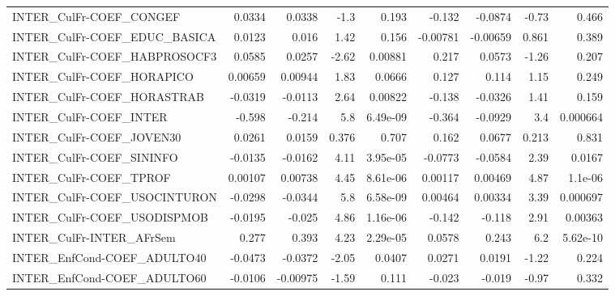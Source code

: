 \begin{tabular}{lrrrrrrrr}
INTER\_CulFr-COEF\_CONGEF               &      0.0334 &       0.0338 &    -1.3 &    0.193 &     -0.132 &     -0.0874 &        -0.73 &         0.466 \\
INTER\_CulFr-COEF\_EDUC\_BASICA          &      0.0123 &        0.016 &    1.42 &    0.156 &   -0.00781 &    -0.00659 &        0.861 &         0.389 \\
INTER\_CulFr-COEF\_HABPROSOCF3          &      0.0585 &       0.0257 &   -2.62 &  0.00881 &      0.217 &      0.0573 &        -1.26 &         0.207 \\
INTER\_CulFr-COEF\_HORAPICO             &     0.00659 &      0.00944 &    1.83 &   0.0666 &      0.127 &       0.114 &         1.15 &         0.249 \\
INTER\_CulFr-COEF\_HORASTRAB            &     -0.0319 &      -0.0113 &    2.64 &  0.00822 &     -0.138 &     -0.0326 &         1.41 &         0.159 \\
INTER\_CulFr-COEF\_INTER                &      -0.598 &       -0.214 &     5.8 & 6.49e-09 &     -0.364 &     -0.0929 &          3.4 &      0.000664 \\
INTER\_CulFr-COEF\_JOVEN30              &      0.0261 &       0.0159 &   0.376 &    0.707 &      0.162 &      0.0677 &        0.213 &         0.831 \\
INTER\_CulFr-COEF\_SININFO              &     -0.0135 &      -0.0162 &    4.11 & 3.95e-05 &    -0.0773 &     -0.0584 &         2.39 &        0.0167 \\
INTER\_CulFr-COEF\_TPROF                &     0.00107 &      0.00738 &    4.45 & 8.61e-06 &    0.00117 &     0.00469 &         4.87 &       1.1e-06 \\
INTER\_CulFr-COEF\_USOCINTURON          &     -0.0298 &      -0.0344 &     5.8 & 6.58e-09 &    0.00464 &     0.00334 &         3.39 &      0.000697 \\
INTER\_CulFr-COEF\_USODISPMOB           &     -0.0195 &       -0.025 &    4.86 & 1.16e-06 &     -0.142 &      -0.118 &         2.91 &       0.00363 \\
INTER\_CulFr-INTER\_AFrSem              &       0.277 &        0.393 &    4.23 & 2.29e-05 &     0.0578 &       0.243 &          6.2 &      5.62e-10 \\
INTER\_EnfCond-COEF\_ADULTO40           &     -0.0473 &      -0.0372 &   -2.05 &   0.0407 &     0.0271 &      0.0191 &        -1.22 &         0.224 \\
INTER\_EnfCond-COEF\_ADULTO60           &     -0.0106 &     -0.00975 &   -1.59 &    0.111 &     -0.023 &      -0.019 &        -0.97 &         0.332 \\

\end{tabular}
